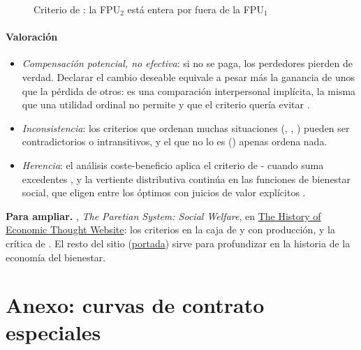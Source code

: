 \documentclass[11pt]{article}
\begin{document}
\begin{figure}[H]
\centering
\caption{Criterio de : la FPU$_2$ está entera por fuera de la FPU$_1$}\label{fig:compensacion-samuelson}
\end{figure}

\paragraph{Valoración}

\begin{itemize}
\item \emph{Compensación potencial, no efectiva}: si no se paga, los perdedores pierden de verdad. Declarar el cambio deseable equivale a pesar más la ganancia de unos que la pérdida de otros: es una comparación interpersonal implícita, la misma que una utilidad ordinal no permite y que el criterio quería evitar\nocite{Little1950Critique} .
\item \emph{Inconsistencia}: los criterios que ordenan muchas situaciones (, , ) pueden ser contradictorios o intransitivos, y el que no lo es () apenas ordena nada.
\item \emph{Herencia}: el análisis coste-beneficio aplica el criterio de - cuando suma excedentes , y la vertiente distributiva continúa en las funciones de bienestar social, que eligen entre los óptimos con juicios de valor explícitos .
\end{itemize}

\begin{anotaciones}
\textbf{Para ampliar.} , \emph{The Paretian System: Social Welfare}, en \href{https://www.hetwebsite.net/het/essays/paretian/paretosocial.htm}{The History of Economic Thought Website}: los criterios en la caja de  y con producción, y la crítica de . El resto del sitio (\href{http://www.hetwebsite.net/het/}{portada}) sirve para profundizar en la historia de la economía del bienestar.
\end{anotaciones}

\section{Anexo: curvas de contrato especiales}\label{anexo:curvas-contrato}
\end{document}
